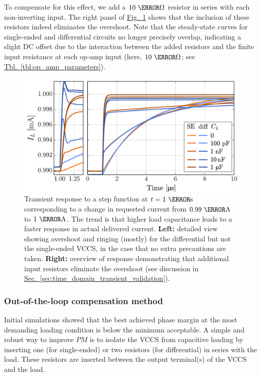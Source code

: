 \documentclass[10pt]{article}
\newcommand{\brieftbllink}[1]{\hyperref[#1]{Tbl.~\ref*{#1}}\xspace }
\newcommand{\briefseclink}[1]{\hyperref[#1]{Sec.~\ref*{#1}}}
\newcommand{\brieffiglink}[1]{\hyperref[#1]{Fig.~\ref*{#1}}}
\begin{document}
To compensate for this effect, we add a $10~\kilo\ohm$ resistor in series with each non-inverting input. The right panel of \brieffiglink{fig:transient_response_sim} shows that the inclusion of these resistors indeed eliminates the overshoot. Note that the steady-state curves for single-ended and differential circuits no longer precisely overlap, indicating a slight DC offset due to the interaction between the added resistors and the finite input resistance at each op-amp input (here, $10~\mega\ohm$; see \brieftbllink{tbl:op_amp_parameters}).

\begin{figure}[tb]
	\centering
    \includegraphics[scale=.6]{transient_response.pdf}
	\caption{\small Transient response to a step function at $t=1~\micro\second$ corresponding to a change in requested current from $0.99~\milli\ampere$ to $1~\milli\ampere$. The trend is that higher load capacitance leads to a faster response in actual delivered current. \textbf{Left:} detailed view showing overshoot and ringing (mostly) for the differential but not the single-ended VCCS, in the case that no extra precautions are taken. \textbf{Right:} overview of response demonstrating that additional input resistors eliminate the overshoot (see discussion in \briefseclink{sec:time_domain_transient_validation}).}
	\label{fig:transient_response_sim}
\end{figure}


\subsubsection{Out-of-the-loop compensation method}
\label{sec:out_of_loop_compensation}

Initial simulations showed that the best achieved phase margin at the most demanding loading condition is below the minimum acceptable. A simple and robust way to improve $PM$ is to isolate the VCCS from capacitive loading by inserting one (for single-ended) or two resistors (for differential) in series with the load. These resistors are inserted between the output terminal(s) of the VCCS and the load.
\end{document}
